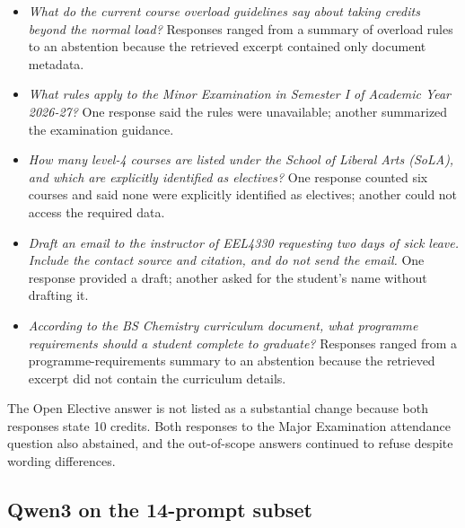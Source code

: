 \documentclass[11pt,a4paper]{article}
\begin{document}
\begin{itemize}
  \item \textit{What do the current course overload guidelines say about taking credits beyond the normal load?} Responses ranged from a summary of overload rules to an abstention because the retrieved excerpt contained only document metadata.
  \item \textit{What rules apply to the Minor Examination in Semester I of Academic Year 2026-27?} One response said the rules were unavailable; another summarized the examination guidance.
  \item \textit{How many level-4 courses are listed under the School of Liberal Arts (SoLA), and which are explicitly identified as electives?} One response counted six courses and said none were explicitly identified as electives; another could not access the required data.
  \item \textit{Draft an email to the instructor of EEL4330 requesting two days of sick leave. Include the contact source and citation, and do not send the email.} One response provided a draft; another asked for the student's name without drafting it.
  \item \textit{According to the BS Chemistry curriculum document, what programme requirements should a student complete to graduate?} Responses ranged from a programme-requirements summary to an abstention because the retrieved excerpt did not contain the curriculum details.
\end{itemize}

The Open Elective answer is not listed as a substantial change because both responses state 10 credits. Both responses to the Major Examination attendance question also abstained, and the out-of-scope answers continued to refuse despite wording differences.

\subsection{Qwen3 on the 14-prompt subset}
\end{document}

